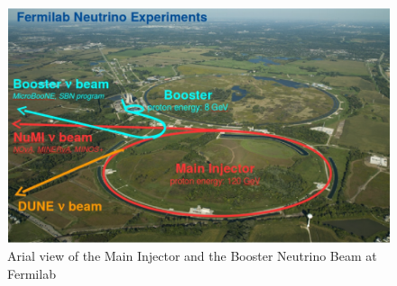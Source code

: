 \begin{figure}[htp!]
\centering
\includegraphics[width=\textwidth]{figs/fnal.png}
\caption{Arial view of the Main Injector and the Booster Neutrino Beam at Fermilab}
\label{fig:fnal}
\end{figure}

